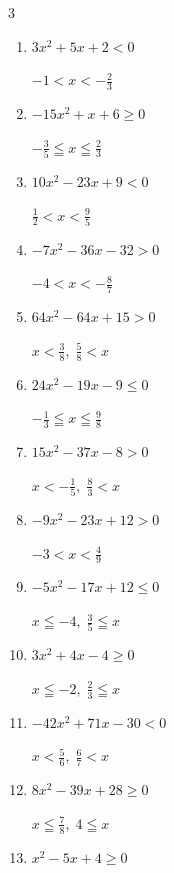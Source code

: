 \begin{multicols}{3}
\begin{enumerate}
  \item $3x^{2}+5x+2<0$

        $\displaystyle -1 < x < -\frac{2}{3}$

  \item $-15x^{2}+x+6\geq 0$

        $\displaystyle -\frac{3}{5} \leqq x \leqq \frac{2}{3}$

  \item $10x^{2}-23x+9<0$

        $\displaystyle \frac{1}{2} < x < \frac{9}{5}$

  \item $-7x^{2}-36x-32>0$

        $\displaystyle -4 < x < -\frac{8}{7}$

  \item $64x^{2}-64x+15>0$

        $\displaystyle x < \frac{3}{8} , \; \frac{5}{8} < x$

  \item $24x^{2}-19x-9\leq 0$

        $\displaystyle -\frac{1}{3} \leqq x \leqq \frac{9}{8}$

\columnbreak %

  \item $15x^{2}-37x-8>0$

        $\displaystyle x < -\frac{1}{5} , \; \frac{8}{3} < x$

  \item $-9x^{2}-23x+12>0$

        $\displaystyle -3 < x < \frac{4}{9}$

  \item $-5x^{2}-17x+12\leq 0$

        $\displaystyle x \leqq -4 , \; \frac{3}{5} \leqq x$

  \item $3x^{2}+4x-4\geq 0$

        $\displaystyle x \leqq -2 , \; \frac{2}{3} \leqq x$

  \item $-42x^{2}+71x-30<0$

        $\displaystyle x < \frac{5}{6} , \; \frac{6}{7} < x$

  \item $8x^{2}-39x+28\geq 0$

        $\displaystyle x \leqq \frac{7}{8} , \; 4 \leqq x$

  \item $x^{2}-5x+4\geq 0$


\end{enumerate}
\end{multicols}
